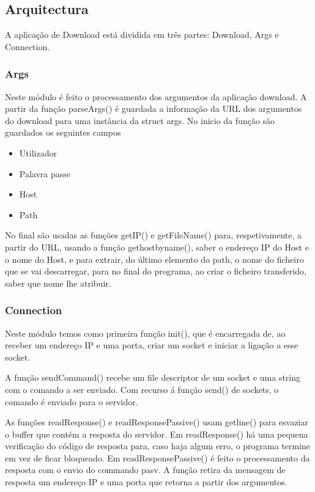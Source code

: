 \subsection{Arquitectura}
A aplicação de Download está dividida em três partes: Download, Args e Connection.

\subsubsection{Args}
Neste módulo é feito o processamento dos argumentos da aplicação download. A partir da função parseArgs() é guardada a informação da URL dos argumentos do download para uma instância da struct args. No inicio da função são guardados os seguintes campos
\begin{itemize}
  \item Utilizador
  \item Palavra passe
  \item Host
  \item Path
\end{itemize}

No final são usadas as funções getIP() e getFileName() para, respetivamente, a partir do URL, usando a função gethostbyname(), saber o endereço IP do Host e o nome do Host, e para extrair, do último elemento do path, o nome do ficheiro que se vai descarregar, para no final do programa, ao criar o ficheiro transferido, saber que nome lhe atribuir.

\subsubsection{Connection}
Neste módulo temos como primeira função init(), que é encarregada de, ao receber um endereço IP e uma porta, criar um socket e iniciar a ligação a esse socket.

A função sendCommand() recebe um file descriptor de um socket e uma string com o comando a ser enviado. Com recurso á função send() de sockets, o comando é enviado para o servidor.

As funções readResponse() e readResponsePassive() usam getline() para esvaziar o buffer que contém a resposta do servidor. Em readResponse() há uma pequena verificação do código de resposta para, caso haja algum erro, o programa termine em vez de ficar bloqueado. Em readResponsePassive() é feito o processamento da resposta com o envio do commando pasv. A função retira da mensagem de resposta um endereço IP e uma porta que retorna a partir dos argumentos.

